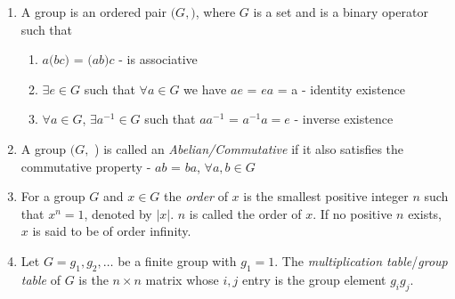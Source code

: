 \documentclass[titlepage, 12pt]{article}
\begin{document}
\begin{enumerate}

	\item A group is an ordered pair $(G,$$)$, where $G$ is a set and
		 is a binary operator such that

		\begin{enumerate}

			\item $a$\ding{72}$(b$$c)$ = $(a$\ding{72}$b)$$c$
				-  is associative

			\item $\exists e\in G$ such that $\forall a\in G$ we have
				$a$\ding{72}$e$ = $e$$a$ = a - identity existence

			\item $\forall a\in G$, $\exists a^{-1}\in G$ such that
				$a$$a^{-1}$ = $a^{-1}$$a = e$ - inverse
				existence

		\end{enumerate}

	\item A group $(G,$ ) is called an \textit{Abelian/Commutative} if
		it also satisfies the commutative property - $a$$b$ =
		$b$$a$, $\forall a, b\in G$

	\item For a group $G$ and $x\in G$ the \textit{order} of $x$ is the smallest
		positive integer $n$ such that $x^n = 1$, denoted by $|x|$. $n$ is
		called the order of $x$. If no positive $n$ exists, $x$ is said to be of
		order infinity.

	\item Let $G = {g_1, g_2,\ldots}$ be a finite group with $g_1 = 1$. The
		\textit{multiplication table}/\textit{group table} of $G$ is the
		$n\times n$ matrix whose $i, j$ entry is the group element $g_ig_j$.

\end{enumerate}
\end{document}
